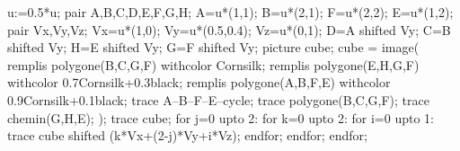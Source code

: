 \begin{exercice*}
\begin{multicols}{2}
\begin{enumerate}
            \begin{Geometrie}
                u:=0.5*u;
                pair A,B,C,D,E,F,G,H;
                A=u*(1,1);
                B=u*(2,1);
                F=u*(2,2);
                E=u*(1,2);
                pair Vx,Vy,Vz;
                Vx=u*(1,0);
                Vy=u*(0.5,0.4);
                Vz=u*(0,1);
                D=A shifted Vy;
                C=B shifted Vy;
                H=E shifted Vy;
                G=F shifted Vy;
                picture cube;
                cube = image(
                    remplis polygone(B,C,G,F) withcolor Cornsilk;
                    remplis polygone(E,H,G,F) withcolor 0.7Cornsilk+0.3black;
                    remplis polygone(A,B,F,E) withcolor 0.9Cornsilk+0.1black;
                    trace A--B--F--E--cycle;
                    trace polygone(B,C,G,F);
                    trace chemin(G,H,E);
                );        
                trace cube;
                for j=0 upto 2:
                    for k=0 upto 2:
                        for i=0 upto 1:
                            trace cube shifted (k*Vx+(2-j)*Vy+i*Vz);
                        endfor;
                    endfor;
                endfor;
            \end{Geometrie}
        \end{enumerate}
    \end{multicols}
\end{exercice*}
